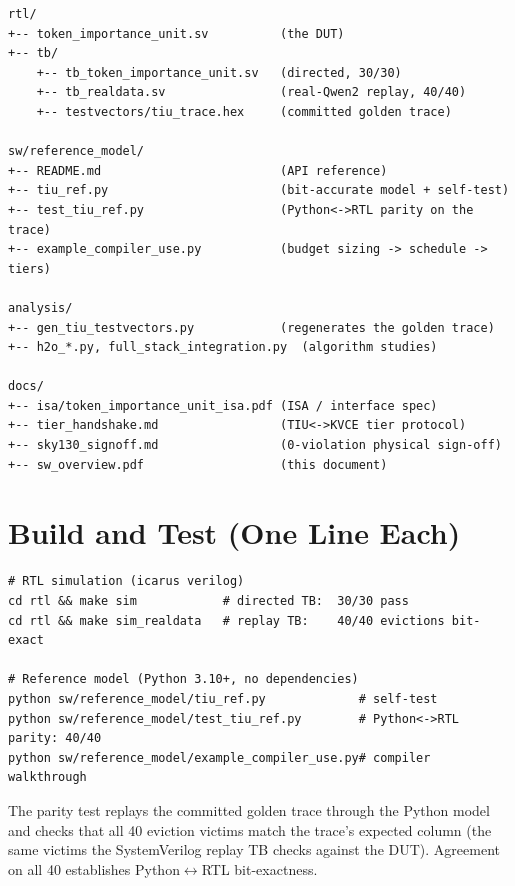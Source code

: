 \documentclass[11pt]{article}
\begin{document}
\begin{lstlisting}[basicstyle=\ttfamily\small]
rtl/
+-- token_importance_unit.sv          (the DUT)
+-- tb/
    +-- tb_token_importance_unit.sv   (directed, 30/30)
    +-- tb_realdata.sv                (real-Qwen2 replay, 40/40)
    +-- testvectors/tiu_trace.hex     (committed golden trace)

sw/reference_model/
+-- README.md                         (API reference)
+-- tiu_ref.py                        (bit-accurate model + self-test)
+-- test_tiu_ref.py                   (Python<->RTL parity on the trace)
+-- example_compiler_use.py           (budget sizing -> schedule -> tiers)

analysis/
+-- gen_tiu_testvectors.py            (regenerates the golden trace)
+-- h2o_*.py, full_stack_integration.py  (algorithm studies)

docs/
+-- isa/token_importance_unit_isa.pdf (ISA / interface spec)
+-- tier_handshake.md                 (TIU<->KVCE tier protocol)
+-- sky130_signoff.md                 (0-violation physical sign-off)
+-- sw_overview.pdf                   (this document)
\end{lstlisting}

\section{Build and Test (One Line Each)}
\label{sec:build}

\begin{lstlisting}[basicstyle=\ttfamily\small]
# RTL simulation (icarus verilog)
cd rtl && make sim            # directed TB:  30/30 pass
cd rtl && make sim_realdata   # replay TB:    40/40 evictions bit-exact

# Reference model (Python 3.10+, no dependencies)
python sw/reference_model/tiu_ref.py             # self-test
python sw/reference_model/test_tiu_ref.py        # Python<->RTL parity: 40/40
python sw/reference_model/example_compiler_use.py# compiler walkthrough
\end{lstlisting}

\noindent The parity test replays the committed golden trace through the Python
model and checks that all 40 eviction victims match the trace's expected column
(the same victims the SystemVerilog replay TB checks against the DUT). Agreement
on all 40 establishes Python$\leftrightarrow$RTL bit-exactness.

\end{document}

